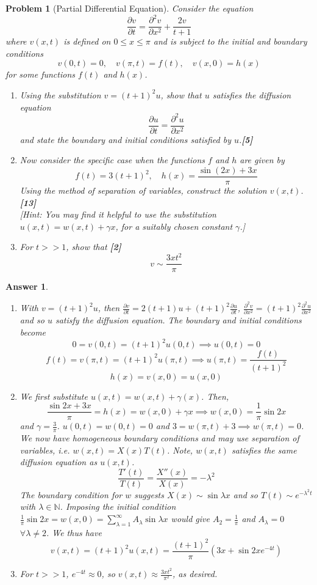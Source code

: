 \documentclass[a4paper]{article}
\newtheorem{ans}{Answer}[section]
\theoremstyle{new}
\newtheorem{qns}{Problem}[section]
\begin{document}
\begin{qns}[Partial Differential Equation]
Consider the equation
$$\frac{\partial v}{\partial t}=\frac{\partial^2v}{\partial x^2}+\frac{2v}{t+1}$$
where $v(x, t)$ is defined on $0\leq x\leq \pi$ and is subject to the initial and boundary conditions
$$v(0,t)=0,\quad v(\pi,t)=f(t),\quad v(x,0)=h(x)$$
for some functions $f(t)$ and $h(x)$.
\begin{enumerate}[label=(\alph*)]
\item Using the substitution $v=(t+1)^2u$, show that $u$ satisfies the diffusion equation
$$\frac{\partial u}{\partial t}=\frac{\partial^2u}{\partial x^2}$$
and state the boundary and initial conditions satisfied by $u$.\hfill\textbf{[5]}
\item Now consider the specific case when the functions $f$ and $h$ are given by
$$f(t)=3(t+1)^2,\quad h(x)=\frac{\sin(2x)+3x}{\pi}$$
Using the method of separation of variables, construct the solution $v(x, t)$.\hfill\textbf{[13]}\\[5pt]
[Hint: You may find it helpful to use the substitution $u(x, t) = w(x, t) + \gamma x$, for a suitably chosen constant $\gamma$.]
\item For $t>>1$, show that \hfill\textbf{[2]}
$$v\sim\frac{3xt^2}{\pi}$$
\end{enumerate}
\end{qns}
\begin{ans}\leavevmode
\begin{enumerate}[label=(\alph*)]
    \item With $v=(t+1)^2u$, then $\frac{\partial v}{\partial t}=2(t+1)u+(t+1)^2\frac{\partial u}{\partial t}$, $\frac{\partial^2v}{\partial x^2}=(t+1)^2\frac{\partial^2u}{\partial x^2}$ and so $u$ satisfy the diffusion equation. The boundary and initial conditions become $$0=v(0,t)=(t+1)^2u(0,t)\implies u(0,t)=0$$ $$f(t)=v(\pi,t)=(t+1)^2u(\pi,t)\implies u(\pi,t)=\frac{f(t)}{(t+1)^2}$$
$$h(x)=v(x,0)=u(x,0)$$
\item We first substitute $u(x,t)=w(x,t)+\gamma (x)$. Then, $$\frac{\sin 2x+3x}{\pi}=h(x)=w(x,0)+\gamma x\implies w(x,0)=\frac{1}{\pi}\sin 2x$$ and $\gamma=\frac{3}{\pi}$. $u(0,t)=w(0,t)=0$ and $3=w(\pi,t)+3\implies w(\pi,t)=0$. We now have homogeneous boundary conditions and may use separation of variables, i.e. $w(x,t)=X(x)T(t)$. Note, $w(x,t)$ satisfies the same diffusion equation as $u(x,t)$.
$$\frac{T'(t)}{T(t)}=\frac{X''(x)}{X(x)}=-\lambda^2$$
The boundary condition for $w$ suggests $X(x)\sim\sin\lambda x$ and so $T(t)\sim e^{-\lambda^2t}$ with $\lambda\in\mathbb{N}$. Imposing the initial condition $\frac{1}{\pi}\sin 2x=w(x,0)=\sum_{\lambda=1}^\infty A_\lambda\sin\lambda x$ would give $A_2=\frac{1}{\pi}$ and $A_\lambda=0$ $\forall\lambda\neq 2$. We thus have
$$v(x,t)=(t+1)^2u(x,t)=\frac{(t+1)^2}{\pi}(3x+\sin 2x e^{-4t})$$
\item For $t>>1$, $e^{-4t}\approx 0$, so $v(x,t)\approx\frac{3xt^2}{\pi^2}$, as desired.
\end{enumerate}
\end{ans}
\end{document}
